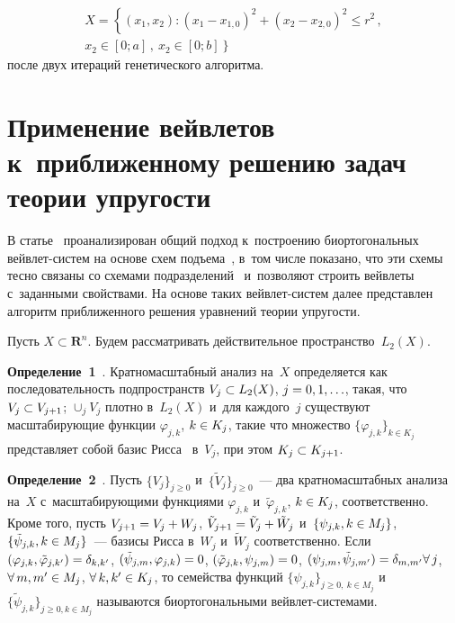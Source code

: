 \begin{multicols}{2}
\vspace*{-6pt}

\noindent
\begin{multline*}
  X=\left\{ \left( x_1,x_2\right): \left( x_1-x_{1,0}\right)^2 +\left( x_2-
x_{2,0}\right)^2 \leq r^2\,,\right.\\ 
\left.x_2\in [0;a]\,,\ x_2\in [0;b]\right\}
\end{multline*}
после двух итераций генетического алгоритма.

\vspace*{-6pt}

\section{Применение вейвлетов к~приближенному решению задач 
теории упругости}

\vspace*{-2pt}

  В статье~\cite{7-bos} проанализирован общий подход к~по\-стро\-ению 
би\-ор\-то\-го\-наль\-ных вейв\-лет-сис\-тем на основе схем подъема~\cite{5-bos}, в~том 
чис\-ле показано, что эти схемы тесно связаны со схемами  
подразделений~\cite{4-bos} и~поз\-во\-ля\-ют строить вейвлеты с~заданными 
свойствами. На основе таких вейв\-лет-сис\-тем далее представлен алгоритм 
при\-бли\-жен\-но\-го решения уравнений тео\-рии упругости.
  
  Пусть $X\subset \mathbf{R}^n$. Будем рассматривать действительное 
пространство~$L_2(X)$.


\smallskip

\noindent
\textbf{Определение~1}~\cite{5-bos}. Кратномасштабный анализ на~$X$ 
определяется как последовательность подпространств $V_j\hm\subset L_2(X)$, 
$j\hm= 0,1,\ldots$, такая, что $V_j\hm\subset V_{j+1}$; $\cup_j V_j$ плотно 
в~$L_2(X)$ и~для каж\-до\-го~$j$ существуют масштабирующие функции 
$\varphi_{j,k}$, $k\hm\in K_j$, такие что множество $\{\varphi_{j,k}\}_{k\in K_j}$ 
пред\-став\-ля\-ет собой базис Рисса~\cite{8-bos} в~$V_j$, при этом $K_j\hm\subset 
K_{j+1}$.


\smallskip

\noindent
\textbf{Определение~2}~\cite{8-bos}. Пусть $\{V_j\}_{j\geq 0}$ 
и~$\{\tilde{V}_j\}_{j\geq0}$~--- два кратномасштабных анализа на~$X$ 
с~масштабирующими функциями $\varphi_{j,k}$ 
и~$\tilde{\varphi}_{j,k}$, $k\hm\in K_j$, соответственно. Кроме того, пусть 
$V_{j+1}\hm= V_j\hm+ W_j$, $\tilde{V}_{j+1} \hm= \tilde{V}_j\hm+ \tilde{W}_j$ 
и~$\{\psi_{j,k}, k\hm\in M_j\}$, $\{ \tilde{\psi}_{j,k}, k\hm\in M_j\}$~--- базисы Рисса 
в~$W_j$ и~$\tilde{W}_j$ соответственно. Если 
$(\varphi_{j,k},\tilde{\varphi}_{j,k^\prime})\hm= \delta_{k,k^\prime}$, 
$(\tilde{\psi}_{j,m}, \varphi_{j,k})\hm= 0$, $( \tilde{\varphi}_{j,k}, \psi_{j,m})\hm=0$, 
$(\psi_{j,m}, \tilde{\psi}_{j,m^\prime})\hm=\delta_{m,m^\prime} \forall\,j$, $\forall\,m, 
m^\prime\hm\in M_j$, $\forall\,k, k^\prime\hm\in K_j$, то семейства функций 
$\{\psi_{j,k}\}_{j\geq0,\ k\in M_j}$ и~$\{ \tilde{\psi}_{j,k}\}_{j\geq0, k\in M_j}$ 
называются би\-ор\-то\-го\-наль\-ны\-ми вейв\-лет-сис\-те\-мами.
  

\end{multicols}

